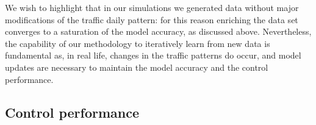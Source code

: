 \begin{remark}
We wish to highlight that in our simulations we generated data without major modifications of the traffic daily pattern: for this reason enriching the data set converges to a saturation of the model accuracy, as discussed above. Nevertheless, the capability of our methodology to iteratively learn from new data is fundamental as, in real life, changes in the traffic patterns do occur, and model updates are necessary to maintain the model accuracy and the control performance. 
\end{remark}


\subsection{Control performance}\label{sec:control_performance}

